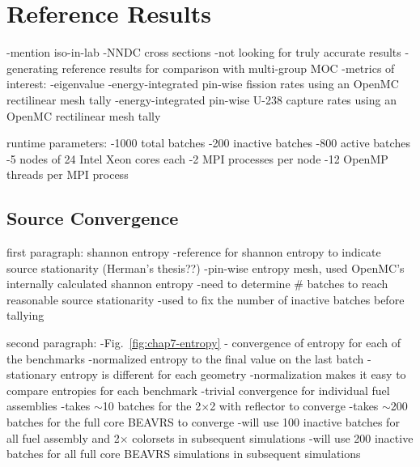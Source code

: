 \section{Reference Results}
\label{sec:chap7-ref-results}

-mention iso-in-lab
-NNDC cross sections
  -not looking for truly accurate results
  -generating reference results for comparison with multi-group \ac{MOC}
-metrics of interest:
  -eigenvalue
  -energy-integrated pin-wise fission rates using an OpenMC rectilinear mesh tally
  -energy-integrated pin-wise U-238 capture rates using an OpenMC rectilinear mesh tally
 
runtime parameters:
-1000 total batches
  -200 inactive batches
  -800 active batches
-5 nodes of 24 Intel Xeon cores each
-2 MPI processes per node
-12 OpenMP threads per MPI process

\subsection{Source Convergence}
\label{subsec:chap7-src-converge}

first paragraph: shannon entropy
-reference for shannon entropy to indicate source stationarity (Herman's thesis??)
-pin-wise entropy mesh, used OpenMC's internally calculated shannon entropy
-need to determine \# batches to reach reasonable source stationarity
-used to fix the number of inactive batches before tallying 

second paragraph:
-Fig.~\ref{fig:chap7-entropy} - convergence of entropy for each of the benchmarks
-normalized entropy to the final value on the last batch
-stationary entropy is different for each geometry
-normalization makes it easy to compare entropies for each benchmark
-trivial convergence for individual fuel assemblies
-takes $\sim$10 batches for the 2$\times$2 with reflector to converge
-takes $\sim$200 batches for the full core \ac{BEAVRS} to converge
-will use 100 inactive batches for all fuel assembly and 2$\times$ colorsets in subsequent simulations
-will use 200 inactive batches for all full core \ac{BEAVRS} simulations in subsequent simulations


